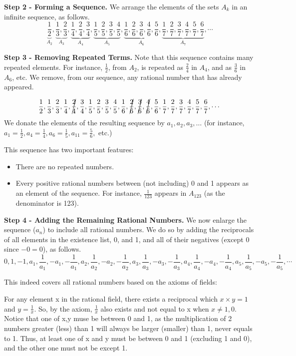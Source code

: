 \documentclass{article}
\begin{document}
\textbf{Step 2 - Forming a Sequence.} We arrange the elements of the sets $A_k$ in an infinite sequence, as follows. $$\underbrace{\frac{1}{2}}_{A_2},\underbrace{\frac13,\frac23}_{A_3},\underbrace{\frac14,\frac24,\frac34}_{A_4},\underbrace{\frac15,\frac25,\frac35,\frac45}_{A_5},\underbrace{\frac16,\frac26,\frac36,\frac46,\frac56}_{A_6},\underbrace{\frac17,\frac27,\frac37,\frac47,\frac57,\frac67}_{A_7},\cdots$$ 

\textbf{Step 3 - Removing Repeated Terms.} Note that this sequence contains many repeated elements. For instance, $\frac{1}{2}$, from $A_2$, is repeated as $\frac{2}{4}$ in $A_4$, and as $\frac36$ in $A_6$, etc. We remove, from our sequence, any rational number that has already appeared. 

$$\frac12,\frac13,\frac23,\frac14,\cancel{\frac24},\frac34,\frac15,\frac25,\frac35,\frac45,\frac16,\cancel{\frac26},\cancel{\frac36},\cancel{\frac46},\frac56,\frac17,\frac27,\frac37,\frac47,\frac57,\frac67,\cdots$$ We donate the elements of the resulting sequence by $a_1,a_2,a_3,\ldots$ (for instance, $a_1=\frac12,a_4=\frac14,a_6=\frac15,a_11=\frac56,$ etc.)

This sequence has two important features:

\begin{itemize}
    \item There are no repeated numbers.
    \item Every positive rational numbers between (not including) 0 and 1 appears as an element of the sequence. For instance, $\frac{1}{123}$ appears in $A_{123}$ (as the denominator is 123).
\end{itemize}

\textbf{Step 4 - Adding the Remaining Rational Numbers.} We now enlarge the sequence ($a_n$) to include all rational numbers. We do so by adding the reciprocals of all elements in the existence list, 0, and 1, and all of their negatives (except 0 since $-0=0$), as follows. $$0, 1, -1, a_1, \frac{1}{a_1},-a_1,-\frac{1}{a_1}, a_2, \frac{1}{a_2},-a_2,-\frac{1}{a_2}, a_3, \frac{1}{a_3},-a_3,-\frac{1}{a_3}, a_4, \frac{1}{a_4},-a_4,-\frac{1}{a_4}, a_5, \frac{1}{a_5},-a_5,-\frac{1}{a_5},\cdots$$

This indeed covers all rational numbers based on the axioms of fields:

For any element x in the rational field, there exists a reciprocal which $x\times y=1$ and $y=\frac1x$. So, by the axiom, $\frac1x$ also exists and not equal to x when $x\neq1,0$. Notice that one of x,y muse be between 0 and 1, as the multiplication of 2 numbers greater (less) than 1 will always be larger (smaller) than 1, never equals to 1. Thus, at least one of x and y must be between 0 and 1 (excluding 1 and 0), and the other one must not be except 1. 
\end{document}

